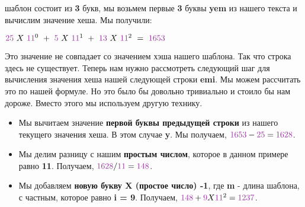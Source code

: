 шаблон состоит из \textbf{3} букв, мы возьмем первые \textbf{3} буквы \textbf{yem} из нашего текста и вычислим
значение хеша. Мы получили:
\vspace{\baselineskip}
\begin{tcolorbox}
$\p{25}~ X~ \p{11}^0~+~\p{5}~ X~ \p{11}^1~+~\p{13}~ X~ \p{11}^2~=~\p{1653}$
\end{tcolorbox}
\vspace{\baselineskip}
Это значение не совпадает со значением хэша нашего шаблона. Так что строка здесь не
существует. Теперь нам нужно рассмотреть следующий шаг для вычисления значения хеша
нашей следующей строки \textbf{emi}. Мы можем рассчитать это по нашей формуле. Но это было бы
довольно тривиально и стоило бы нам дороже. Вместо этого мы используем другую технику.

\vspace{\baselineskip}
\begin{itemize}
    \item Мы вычитаем значение \textbf{первой буквы предыдущей строки} из нашего текущего значения хеша. В этом случае \textbf{y}. Мы получаем, $\p{1653} - \p{25} = \p{1628}$.
    \item Мы делим разницу с нашим \textbf{простым числом}, которое в данном примере равно \textbf{11}. Получаем, $\p{1628}/\p{11} = \p{148}$.
    \item Мы добавляем \textbf{новую букву X (простое число) -1}, где \textbf{m} - длина шаблона, с частным, которое равно \textbf{i = 9}. Получаем, $\p{148} + \p{9} X \p{11}^2 = \p{1237}$.
\end{itemize}
\vspace{\baselineskip}

